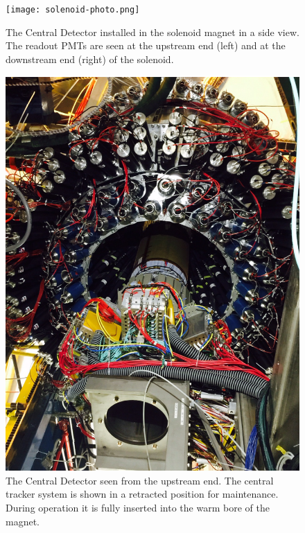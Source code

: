 \documentclass[final,3p,twocolumn]{elsarticle}
\begin{document}
\begin{figure}[thp!]
\centerline{\texttt{[image: solenoid-photo.png]}}
\caption{The Central Detector installed in the solenoid magnet in a side view. The readout PMTs are seen at the
  upstream end (left) and at the downstream end (right) of the solenoid.}
\label{CDinSol}
\centerline{\includegraphics[width=1.0\columnwidth]{CLAS12-CD.png}}
\caption{The Central Detector seen from the upstream end. The central tracker system is shown in a retracted
  position for maintenance. During operation it is fully inserted into the warm bore of the magnet.}
\label{CDback}
\end{figure}
\end{document}
